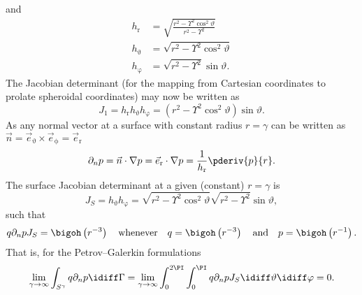 and
\begin{align*}
	h_{\mathrm{r}} &= \sqrt{\frac{r^2-\Upsilon^2\cos^2\vartheta}{r^2-\Upsilon^2}}\\
	h_{\upvartheta} &= \sqrt{r^2-\Upsilon^2\cos^2\vartheta}\\
	h_{\upvarphi} &= \sqrt{r^2-\Upsilon^2}\sin\vartheta.
\end{align*}
The Jacobian determinant (for the mapping from Cartesian coordinates to prolate spheroidal coordinates) may now be written as
\begin{equation}
	J_1 = h_{\mathrm{r}} h_{\upvartheta} h_{\upvarphi} = \left(r^2-\Upsilon^2\cos^2\vartheta\right)\sin\vartheta.
\end{equation}
As any normal vector at a surface with constant radius $r=\gamma$ can be written as $\vec{n} = \vec{e}_{\upvartheta}\times\vec{e}_{\upphi}=\vec{e}_{\mathrm{r}}$
\begin{equation}
	\partial_n p = \vec{n}\cdot\nabla p = \vec{e}_{\mathrm{r}}\cdot\nabla p = \frac{1}{h_{\mathrm{r}}} \pderiv{p}{r}.
\end{equation}
The surface Jacobian determinant at a given (constant) $r=\gamma$ is
\begin{equation}
	J_S = h_{\upvartheta} h_{\upvarphi} = \sqrt{r^2-\Upsilon^2\cos^2\vartheta}\sqrt{r^2-\Upsilon^2}\sin\vartheta,
\end{equation}
such that
\begin{equation}
	q\partial_n p J_S = \bigoh\left(r^{-3}\right)\quad\text{whenever}\quad q=\bigoh\left(r^{-3}\right)\quad\text{and}\quad p = \bigoh\left(r^{-1}\right).
\end{equation}
That is, for the Petrov--Galerkin formulations
\begin{equation}
	\lim_{\gamma\to\infty}\int_{S^\gamma} q\partial_n p\idiff\Gamma = \lim_{\gamma\to\infty}\int_0^{2\PI}\int_0^\PI q\partial_n p J_S\idiff\vartheta\idiff\varphi = 0.
\end{equation}

